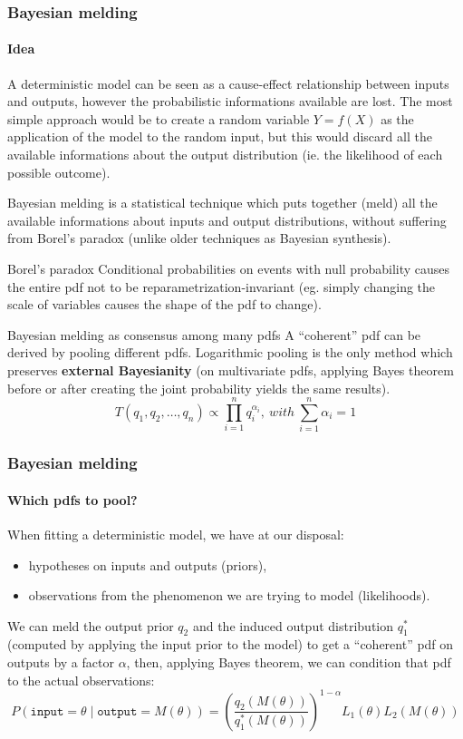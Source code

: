\documentclass[aspectratio=43]{beamer}
\begin{document}
\begin{frame}
	\frametitle{Bayesian melding}
	\framesubtitle{Idea}
{\tiny 	A deterministic model can be seen as a cause-effect relationship between inputs and outputs, however the probabilistic informations available are lost. The most simple approach would be to create a random variable $Y = f(X)$ as the application of the model to the random input, but this would discard all the available informations about the output distribution (ie. the likelihood of each possible outcome).
	
	Bayesian melding is a statistical technique which puts together (meld) all the available informations about inputs and output distributions, without suffering from Borel's paradox (unlike older techniques as Bayesian synthesis).
	\begin{alertblock}{Borel's paradox}
		Conditional probabilities on events with null probability causes the entire pdf not to be reparametrization-invariant (eg. simply changing the scale of variables causes the shape of the pdf to change).
	\end{alertblock}

	\begin{block}{Bayesian melding as consensus among many pdfs}
		A ``coherent'' pdf can be derived by pooling different pdfs. Logarithmic pooling is the only method which preserves \textbf{external Bayesianity} (on multivariate pdfs, applying Bayes theorem before or after creating the joint probability yields the same results).
		\begin{equation*}
		T(q_1, q_2, \dots, q_n) \propto \displaystyle\prod_{i=1}^n q_i^{\alpha_i},\ with\ \displaystyle\sum_{i=1}^n \alpha_i = 1
		\end{equation*}
	\end{block}
}
\end{frame}

\begin{frame}
	\frametitle{Bayesian melding}
	\framesubtitle{Which pdfs to pool?}
	When fitting a deterministic model, we have at our disposal:
	\begin{itemize}
		\item hypotheses on inputs and outputs (priors),
		\item observations from the phenomenon we are trying to model (likelihoods).
	\end{itemize}	
	
	We can meld the output prior $q_2$ and the induced output distribution $q_1^*$ (computed by applying the input prior to the model) to get a ``coherent'' pdf on outputs by a factor $\alpha$, then, applying Bayes theorem, we can condition that pdf to the actual observations:
	\begin{equation*}
		P(\texttt{input} = \theta \mid \texttt{output} = M(\theta)) = (\frac{q_2(M(\theta))}{q_1^*(M(\theta))}) ^ {1-\alpha} L_1(\theta) L_2(M(\theta))
	\end{equation*}
\end{frame}
\end{document}
